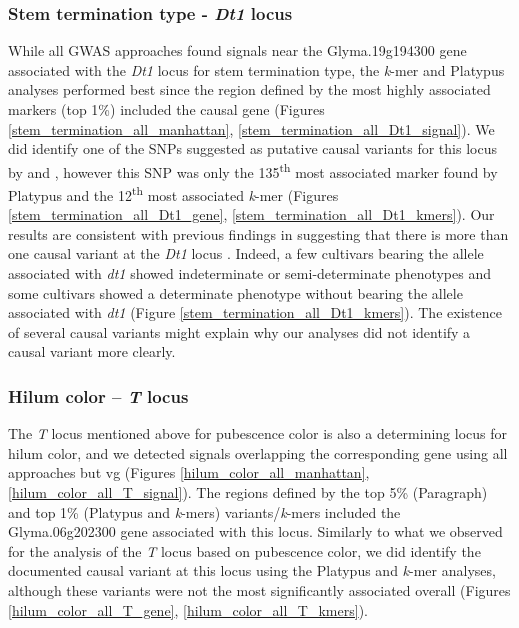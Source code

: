 \subsubsection*{Stem termination type - \textit{Dt1} locus}
\label{sv-gwas-main-results-stem-termination-dt1}

While all GWAS approaches found signals near the Glyma.19g194300 gene
associated with the \textit{Dt1} locus for stem termination type, the
\textit{k}-mer and Platypus analyses performed best since the region defined by the most highly associated markers
(top 1\%) included the causal gene (Figures
\ref{stem_termination_all_manhattan}, \ref{stem_termination_all_Dt1_signal}).
We did identify one of the SNPs suggested as putative causal variants for this
locus by \cite{tian2010} and \cite{liu2010}, however this SNP was only the
135\textsuperscript{th} most associated marker found by Platypus and the
12\textsuperscript{th} most associated \emph{k}-mer (Figures
\ref{stem_termination_all_Dt1_gene}, \ref{stem_termination_all_Dt1_kmers}).
Our results are consistent with previous findings in
suggesting that there is more than one causal variant at the \textit{Dt1} locus \citep{liu2010, tian2010}. Indeed, a
few cultivars bearing the allele associated with \emph{dt1} showed
indeterminate or semi-determinate phenotypes and some cultivars showed a
determinate phenotype without bearing the allele associated with \emph{dt1}
(Figure \ref{stem_termination_all_Dt1_kmers}). The existence of several causal
variants might explain why our analyses did not identify a causal variant more
clearly.

\subsubsection*{Hilum color -- \textit{T} locus}
\label{sv-gwas-main-results-hilum-color-t}

The \textit{T} locus mentioned above for pubescence color is also a determining
locus for hilum color, and we detected signals overlapping the corresponding gene
using all approaches but vg (Figures \ref{hilum_color_all_manhattan},
\ref{hilum_color_all_T_signal}). The regions defined by the top 5\% (Paragraph)
and top 1\% (Platypus and \textit{k}-mers) variants/\textit{k}-mers included
the Glyma.06g202300 gene associated with this locus. Similarly to what we
observed for the analysis of the \textit{T} locus based on pubescence color, we
did identify the documented causal variant at this locus using the Platypus and
\textit{k}-mer analyses, although these variants were not the most
significantly associated overall (Figures \ref{hilum_color_all_T_gene},
\ref{hilum_color_all_T_kmers}).

